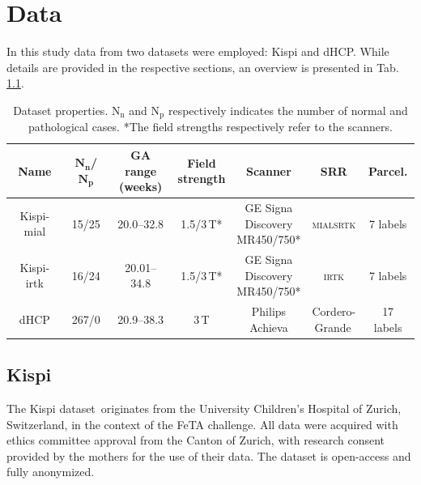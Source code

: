 \chapter{Data} \label{chap:Data}
\vspace{1cm}

In this study data from two datasets were employed: Kispi and dHCP. While details are provided in the respective sections, an overview is presented in Tab.\,\ref{tab:datasets}.
\begin{table}[htbp]
    \centering
    \begin{tabular}{c|c|c|c|c|c|c}
        \toprule
        \textbf{Name} & $\textbf{N}_\textbf{n}$\textbf{/}$\textbf{N}_\textbf{p}$ & \makecell{\textbf{GA range} \\ \textbf{(weeks)}} & \makecell{\textbf{Field} \\ \textbf{strength}} & \textbf{Scanner} & \textbf{SRR} & \textbf{Parcel.} \\
        \midrule
        Kispi-mial & 15/25 & 20.0--32.8 & 1.5/3\,T* & \makecell{GE Signa \\ Discovery \\ MR450/750*} & \makecell{\textsc{mialsrtk} \\ \cite{Tourbier2015}} & 7 labels \\ \hline
        Kispi-irtk & 16/24 & 20.01--34.8 & 1.5/3\,T* & \makecell{GE Signa \\ Discovery \\ MR450/750*} & \makecell{\textsc{irtk} \\ \cite{Kuklisova2012}} & 7 labels \\ \hline
        dHCP & 267/0 & 20.9--38.3 & 3\,T & \makecell{Philips \\ Achieva} & \makecell{Cordero- \\ Grande\,\cite{CorderoGrande2018}} & 17 labels \\
        \bottomrule
    \end{tabular}
    \caption{Dataset properties. $\text{N}_\text{n}$ and $\text{N}_\text{p}$ respectively indicates the number of normal and pathological cases. *The field strengths respectively refer to the scanners.}
    \label{tab:datasets}
\end{table}

\section{Kispi}
The Kispi dataset\,\cite{Payette2021, FeTA_MICCAI} originates from the University Children's Hospital of Zurich, Switzerland, in the context of the FeTA challenge. All data were acquired with ethics committee approval from the Canton of Zurich, with research consent provided by the mothers for the use of their data. The dataset is open-access and fully anonymized.

